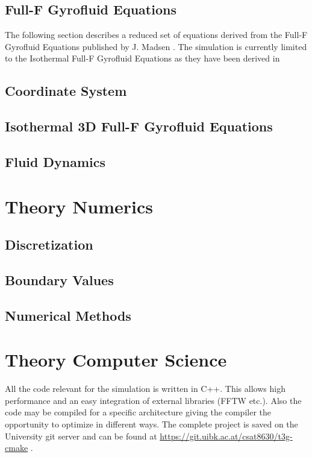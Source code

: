 \documentclass[12pt,oneside,bibtotoc,liststotoc]{scrbook}
\begin{document}
\section{Full-F Gyrofluid Equations}
The following section describes a reduced set of equations derived from the Full-F Gyrofluid Equations published by J. Madsen \cite{doi:10.1063/1.4813241}.
The simulation is currently limited to the Isothermal Full-F Gyrofluid Equations as they have been derived in

\section{Coordinate System}

\section{Isothermal 3D Full-F Gyrofluid Equations}
\label{sec:isothermalequations}



\section{Fluid Dynamics}
\label{sec:fluid-dynamics}


\chapter{Theory Numerics}
\section{Discretization}

\section{Boundary Values}

\section{Numerical Methods}


\chapter{Theory Computer Science}
All the code relevant for the simulation is written in C++. This allows high performance and an easy integration of external libraries (FFTW etc.). Also the code may be compiled for a specific architecture giving the compiler the opportunity to optimize in different ways.\newline
The complete project is saved on the University git server and can be found at \href{https://git.uibk.ac.at/csat8630/t3g-cmake}{https://git.uibk.ac.at/csat8630/t3g-cmake}
.
\end{document}
